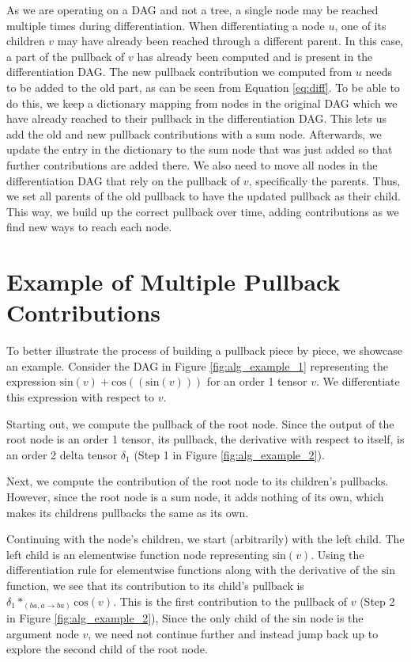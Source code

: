 \documentclass[12pt, a4paper]{report}
\begin{document}
As we are operating on a DAG and not a tree, a single node may be reached multiple times during differentiation.
When differentiating a node $u$, one of its children $v$ may have already been reached through a different parent.
In this case, a part of the pullback of $v$ has already been computed and is present in the differentiation DAG.
The new pullback contribution we computed from $u$ needs to be added to the old part, as can be seen from Equation \ref{eq:diff}.
To be able to do this, we keep a dictionary mapping from nodes in the original DAG which we have already reached to their pullback in the differentiation DAG.
This lets us add the old and new pullback contributions with a sum node.
Afterwards, we update the entry in the dictionary to the sum node that was just added so that further contributions are added there.
We also need to move all nodes in the differentiation DAG that rely on the pullback of $v$, specifically the parents.
Thus, we set all parents of the old pullback to have the updated pullback as their child.
This way, we build up the correct pullback over time, adding contributions as we find new ways to reach each node.

\FloatBarrier
\section{Example of Multiple Pullback Contributions}
To better illustrate the process of building a pullback piece by piece, we showcase an example.
Consider the DAG in Figure \ref{fig:alg_example_1} representing the expression $\text{sin}(v) + \text{cos}((\text{sin}(v)))$ for an order 1 tensor $v$.
We differentiate this expression with respect to $v$.

Starting out, we compute the pullback of the root node.
Since the output of the root node is an order 1 tensor, its pullback, the derivative with respect to itself, is an order 2 delta tensor $\delta_1$ (Step 1 in Figure \ref{fig:alg_example_2}).

Next, we compute the contribution of the root node to its children's pullbacks.
However, since the root node is a sum node, it adds nothing of its own, which makes its childrens pullbacks the same as its own.

Continuing with the node's children, we start (arbitrarily) with the left child.
The left child is an elementwise function node representing $\text{sin}(v)$.
Using the differentiation rule for elementwise functions along with the derivative of the $\text{sin}$ function, we see that its contribution to its child's pullback is $\delta_1 *_{(ba,a \rightarrow ba)} \text{cos}(v)$.
This is the first contribution to the pullback of $v$ (Step 2 in Figure \ref{fig:alg_example_2}),
Since the only child of the $\text{sin}$ node is the argument node $v$, we need not continue further and instead jump back up to explore the second child of the root node.
\end{document}
